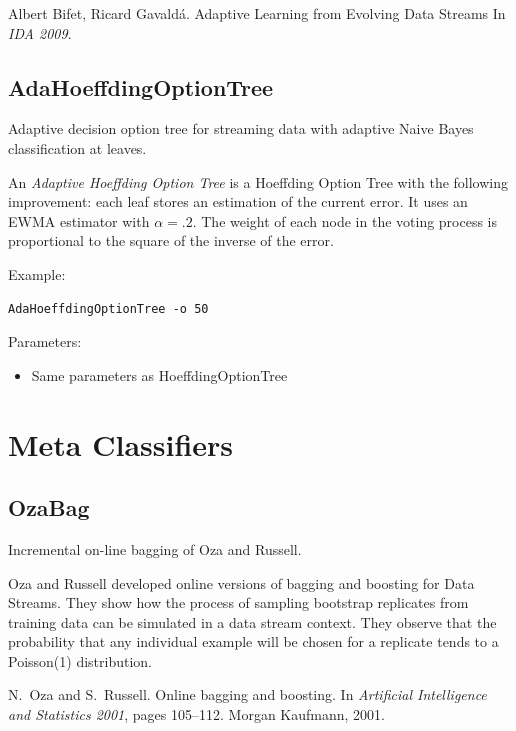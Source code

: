 \documentclass[a4paper,12pt,twoside]{book}
\begin{document}
 \begin{itemize}
Albert Bifet, Ricard Gavald\'a.
\newblock Adaptive Learning from Evolving Data Streams
\newblock In {\em IDA 2009}.
\end{itemize}


\subsection{AdaHoeffdingOptionTree}
Adaptive decision option tree for streaming data with adaptive Naive Bayes classification at leaves.

An {\em Adaptive Hoeffding Option Tree} is a Hoeffding Option Tree with the following improvement:
each leaf stores an estimation of the current error. It uses an EWMA
estimator with $\alpha =.2$.
The weight of each node in the voting process is 
proportional to the square of the inverse of the error.

Example:
\begin{footnotesize}\begin{verbatim}
AdaHoeffdingOptionTree -o 50
\end{verbatim}\end{footnotesize}

Parameters:
\begin{itemize}
\item Same parameters as HoeffdingOptionTree
\end{itemize}

\section{Meta Classifiers}




\subsection{OzaBag} Incremental on-line bagging of Oza and Russell.

Oza and Russell developed online versions %
of bagging and boosting for Data Streams. They show how the process
of sampling bootstrap replicates from training data can be simulated in a 
data stream context. 
They observe that the probability that any individual
example will be chosen for a replicate 
tends to a Poisson(1) distribution. 


\begin{itemize}
N.~Oza and S.~Russell.
\newblock Online bagging and boosting.
\newblock In {\em Artificial Intelligence and Statistics 2001}, pages 105--112.
  Morgan Kaufmann, 2001.
\end{itemize}
\end{document}

